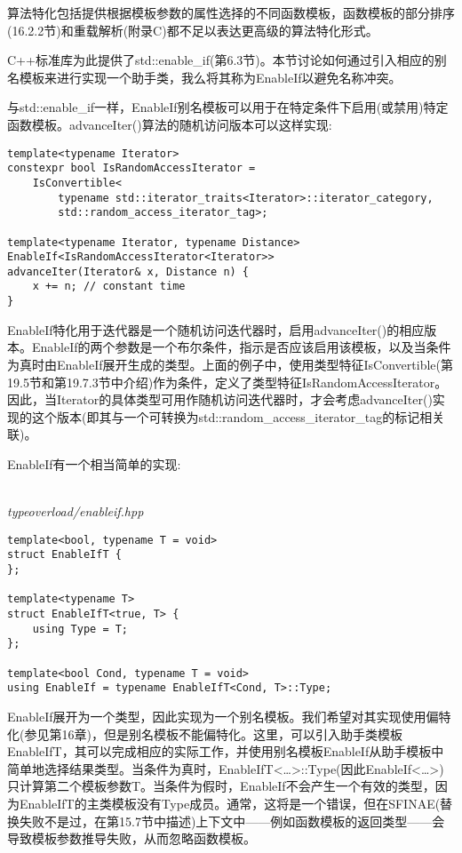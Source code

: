 
算法特化包括提供根据模板参数的属性选择的不同函数模板，函数模板的部分排序(16.2.2节)和重载解析(附录C)都不足以表达更高级的算法特化形式。

C++标准库为此提供了std::enable\_if(第6.3节)。本节讨论如何通过引入相应的别名模板来进行实现一个助手类，我么将其称为EnableIf以避免名称冲突。

与std::enable\_if一样，EnableIf别名模板可以用于在特定条件下启用(或禁用)特定函数模板。advanceIter()算法的随机访问版本可以这样实现:

\begin{lstlisting}[style=styleCXX]
template<typename Iterator>
constexpr bool IsRandomAccessIterator =
	IsConvertible<
		typename std::iterator_traits<Iterator>::iterator_category,
		std::random_access_iterator_tag>;
		
template<typename Iterator, typename Distance>
EnableIf<IsRandomAccessIterator<Iterator>>
advanceIter(Iterator& x, Distance n) {
	x += n; // constant time
}
\end{lstlisting}

EnableIf特化用于迭代器是一个随机访问迭代器时，启用advanceIter()的相应版本。EnableIf的两个参数是一个布尔条件，指示是否应该启用该模板，以及当条件为真时由EnableIf展开生成的类型。上面的例子中，使用类型特征IsConvertible(第19.5节和第19.7.3节中介绍)作为条件，定义了类型特征IsRandomAccessIterator。因此，当Iterator的具体类型可用作随机访问迭代器时，才会考虑advanceIter()实现的这个版本(即其与一个可转换为std::random\_access\_iterator\_tag的标记相关联)。

EnableIf有一个相当简单的实现:

\hspace*{\fill} \\ %
\noindent
\textit{typeoverload/enableif.hpp}
\begin{lstlisting}[style=styleCXX]
template<bool, typename T = void>
struct EnableIfT {
};

template<typename T>
struct EnableIfT<true, T> {
	using Type = T;
};

template<bool Cond, typename T = void>
using EnableIf = typename EnableIfT<Cond, T>::Type;
\end{lstlisting}

EnableIf展开为一个类型，因此实现为一个别名模板。我们希望对其实现使用偏特化(参见第16章)，但是别名模板不能偏特化。这里，可以引入助手类模板EnableIfT，其可以完成相应的实际工作，并使用别名模板EnableIf从助手模板中简单地选择结果类型。当条件为真时，EnableIfT<…>::Type(因此EnableIf<…>)只计算第二个模板参数T。当条件为假时，EnableIf不会产生一个有效的类型，因为EnableIfT的主类模板没有Type成员。通常，这将是一个错误，但在SFINAE(替换失败不是过，在第15.7节中描述)上下文中——例如函数模板的返回类型——会导致模板参数推导失败，从而忽略函数模板。

